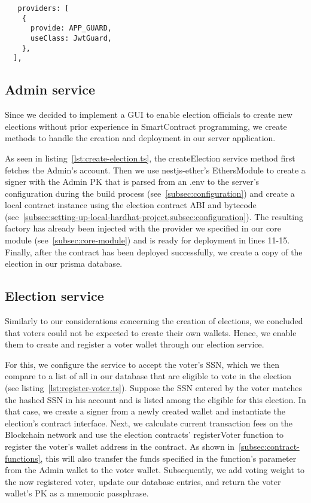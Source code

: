 \begin{verbatim}
   providers: [
    {
      provide: APP_GUARD,
      useClass: JwtGuard,
    },
  ],
\end{verbatim}

\subsection{Admin service}\label{subsec:admin-service}

Since we decided to implement a \gls{GUI} to enable election officials to create new elections without prior experience in \gls{SmartContract} programming, we create methods to handle the creation and deployment in our server application.

As seen in listing~\ref{lst:create-election.ts}, the createElection service method first fetches the \gls{Admin}'s account.
Then we use nestjs-ether's EthersModule to create a signer with the \gls{Admin} \gls{PK} that is parsed from an .env to the server's configuration during the build process (see~\cref{subsec:configuration}) and create a local contract instance using the election contract \gls{ABI} and bytecode (see~\cref{subsec:setting-up-local-hardhat-project,subsec:configuration}).
The resulting factory has already been injected with the provider we specified in our core module (see~\cref{subsec:core-module}) and is ready for deployment in lines 11-15.
Finally, after the contract has been deployed successfully, we create a copy of the election in our prisma database.


\subsection{Election service}\label{subsec:election-service}

Similarly to our considerations concerning the creation of elections, we concluded that voters could not be expected to create their own wallets.
Hence, we enable them to create and register a voter wallet through our election service.

For this, we configure the service to accept the voter's \gls{SSN}, which we then compare to a list of all  in our database that are eligible to vote in the election (see listing~\ref{lst:register-voter.ts}).
Suppose the \gls{SSN} entered by the voter matches the hashed \gls{SSN} in his account and is listed among the eligible  for this election.
In that case, we create a signer from a newly created wallet and instantiate the election's contract interface.
Next, we calculate current transaction fees on the \gls{Blockchain} network and use the election contracts' registerVoter function to register the voter's wallet address in the contract.
As shown in~\cref{subsec:contract-functions}, this will also transfer the funds specified in the function's parameter from the \gls{Admin} wallet to the voter wallet.
Subsequently, we add voting weight to the now registered voter, update our database entries, and return the voter wallet's \gls{PK} as a mnemonic passphrase.

